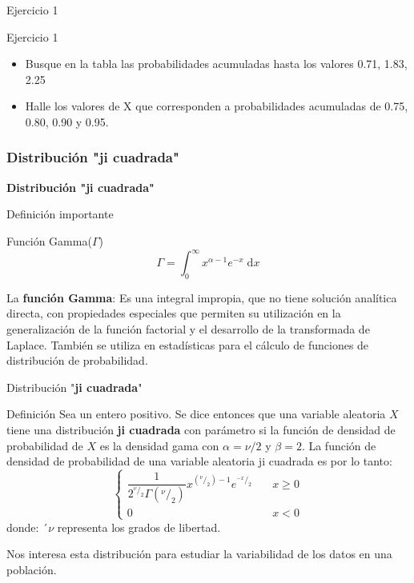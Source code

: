 \documentclass[11pt]{beamer}
\begin{document}
      \begin{frame}{Ejercicio 1}
          \begin{block}{Ejercicio 1}
              \begin{itemize}
                  \item Busque en la tabla las probabilidades acumuladas hasta los valores 0.71, 1.83, 2.25
                  \item Halle los valores de X que corresponden a probabilidades acumuladas de 0.75, 0.80, 0.90 y 0.95.
              \end{itemize}
          \end{block}
      \end{frame}


      \subsubsection*{Distribución "\textbf{ji cuadrada}"}

        \begin{frame}{}
          \begin{center}
            \textbf{            \huge Distribución "\textbf{ji cuadrada}"}
          \end{center}
        \end{frame}


        \begin{frame}{Definición importante}
            \begin{block}{Funci\'on Gamma($\Gamma$)}
                $$\Gamma = \int_0^\infty x^{\alpha -1} e^{-x}\; \mathrm{d}x$$
            \end{block}
            La \textbf{función Gamma}: Es una integral impropia, que no tiene solución analítica directa, con propiedades especiales que permiten su utilización en la generalización de la función factorial y el desarrollo de la transformada de Laplace. También se utiliza en estadísticas para el cálculo de funciones de distribución de probabilidad.
        \end{frame}

        \begin{frame}{Distribución "\textbf{ji cuadrada}"}
          \begin{block}{Definici\'on}
             Sea un entero positivo. Se dice entonces que una variable aleatoria $X$ tiene una distribución \textbf{ji cuadrada} con parámetro si la función de densidad de probabilidad de $X$ es la densidad gama con $\alpha = \nu/2$ y $\beta = 2$. La función de densidad de probabilidad de una variable aleatoria ji cuadrada es por lo tanto:
             \pause
             $$ \begin{cases}
                 \dfrac{1}{2^{^{\nu}/_2}\Gamma(^{\nu}/_2)}x^{(^{\nu}/_2)-1}e^{^{-x}/_2}       & \quad x \geq 0\\
                 0  & \quad x < 0
             \end{cases}$$
         donde: ´$\nu$ representa los grados de libertad.
          \end{block}

          Nos interesa esta distribución para estudiar la variabilidad de los datos en una población.
        \end{frame}
\end{document}
